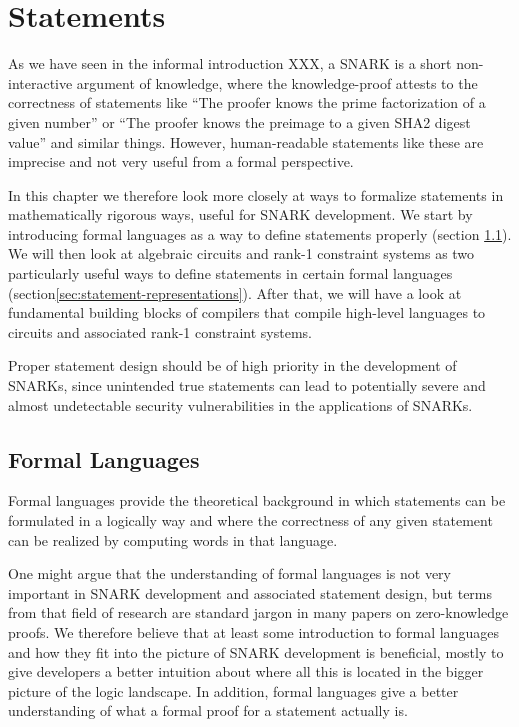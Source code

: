 \chapter{Statements}\label{sec:statements}\label{chap:statements}

As we have seen in the informal introduction XXX, a SNARK is a short non-interactive argument of knowledge, where the knowledge-proof attests to the correctness of statements like ``The proofer knows the prime factorization of a given number'' or ``The proofer knows the preimage to a given SHA2 digest value'' and similar things. However,  human-readable statements like these are imprecise and not very useful from a formal perspective. 

In this chapter we therefore look more closely at ways to formalize statements in mathematically rigorous ways, useful for SNARK development. We start by introducing formal languages as a way to define statements properly (section \ref{sec:formal-languages}). We will then look at algebraic circuits and rank-1 constraint systems as two particularly useful ways to define statements in certain formal languages (section\ref{sec:statement-representations}). After that, we will have a look at fundamental building blocks of compilers that compile high-level languages to circuits and associated rank-1 constraint systems.

Proper statement design should be of high priority in the development of SNARKs, since unintended true statements can lead to potentially severe and almost undetectable security vulnerabilities in the applications of SNARKs.

\section{Formal Languages}\label{sec:formal-languages}

Formal languages provide the theoretical background in which statements can be formulated in a logically   way and where   the correctness of any given statement can be realized by computing words in that language.

One might argue that the understanding of formal languages is not very important in SNARK development and associated statement design, but terms from that field of research are standard jargon in many papers on zero-knowledge proofs. We therefore believe that at least some introduction to formal languages and how they fit into the picture of SNARK development is beneficial, mostly to give developers a better intuition about where all this is located in the bigger picture of the logic landscape. In addition, formal languages give a better understanding of what a formal proof for a statement actually is.

